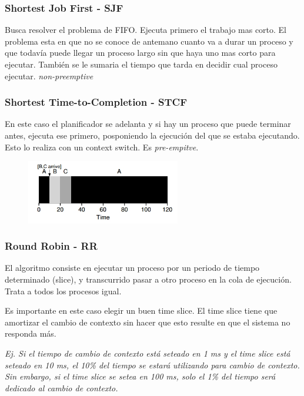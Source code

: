 \documentclass[titlepage,a4paper]{article}
\begin{document}
\subsubsection*{Shortest Job First - SJF}
Busca resolver el problema de FIFO. Ejecuta primero el trabajo mas corto. El problema esta en que no se conoce de antemano cuanto va a durar un proceso y que todavía puede llegar un proceso largo sin que haya uno mas corto para ejecutar. También se le sumaria el tiempo que tarda en decidir cual proceso ejecutar. \emph{non-preemptive}


\subsubsection*{Shortest Time-to-Completion - STCF}
En este caso el planificador se adelanta y si hay un proceso que puede terminar antes, ejecuta ese primero, posponiendo la ejecución del que se estaba ejecutando. Esto lo realiza con un context switch. Es \emph{pre-empitve}.

\begin{figure}[!htb]
    \centering
    \includegraphics[width=0.6\textwidth]{ImagenesApunte/fifo_stcf.jpg}
\end{figure}

\subsubsection*{Round Robin - RR}
El algoritmo consiste en ejecutar un proceso por un periodo de tiempo determinado (slice), y transcurrido pasar a otro proceso en la cola de ejecución. Trata a todos los procesos igual.

Es importante en este caso elegir un buen time slice. El time slice tiene que amortizar el cambio de contexto sin hacer que esto resulte en que el sistema no responda más.

\textit{Ej. Si el tiempo de cambio de contexto está seteado en 1 ms y el time slice está seteado en 10 ms, el 10\% del tiempo se estará utilizando para cambio de contexto. Sin embargo, si el time slice se setea en 100 ms, solo el 1\% del tiempo será dedicado al cambio de contexto.}
\end{document}
